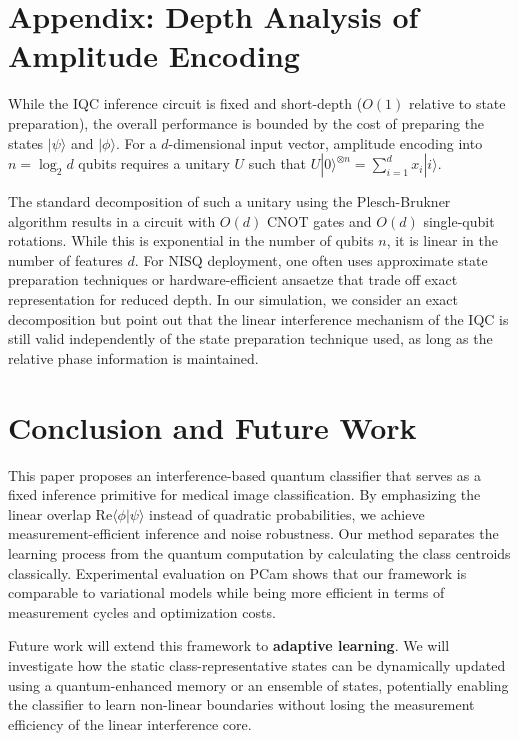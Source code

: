 \documentclass[conference]{IEEEtran}
\begin{document}
\section*{Appendix: Depth Analysis of Amplitude Encoding}

While the IQC inference circuit is fixed and short-depth ($O(1)$ relative to state preparation), the overall performance is bounded by the cost of preparing the states $|\psi\rangle$ and $|\phi\rangle$. For a $d$-dimensional input vector, amplitude encoding into $n = \log_2 d$ qubits requires a unitary $U$ such that $U|0\rangle^{\otimes n} = \sum_{i=1}^d x_i |i\rangle$.

The standard decomposition of such a unitary using the Plesch-Brukner algorithm \cite{plesch2011quantum} results in a circuit with $O(d)$ CNOT gates and $O(d)$ single-qubit rotations. While this is exponential in the number of qubits $n$, it is linear in the number of features $d$. For NISQ deployment, one often uses approximate state preparation techniques or hardware-efficient ansaetze that trade off exact representation for reduced depth. In our simulation, we consider an exact decomposition but point out that the linear interference mechanism of the IQC is still valid independently of the state preparation technique used, as long as the relative phase information is maintained.

\section{Conclusion and Future Work}

This paper proposes an interference-based quantum classifier that serves as a fixed inference primitive for medical image classification. By emphasizing the linear overlap $\mathrm{Re}\langle \phi | \psi \rangle$ instead of quadratic probabilities, we achieve measurement-efficient inference and noise robustness. Our method separates the learning process from the quantum computation by calculating the class centroids classically. Experimental evaluation on PCam shows that our framework is comparable to variational models while being more efficient in terms of measurement cycles and optimization costs.

Future work will extend this framework to \textbf{adaptive learning}. We will investigate how the static class-representative states can be dynamically updated using a quantum-enhanced memory or an ensemble of states, potentially enabling the classifier to learn non-linear boundaries without losing the measurement efficiency of the linear interference core.
\end{document}
